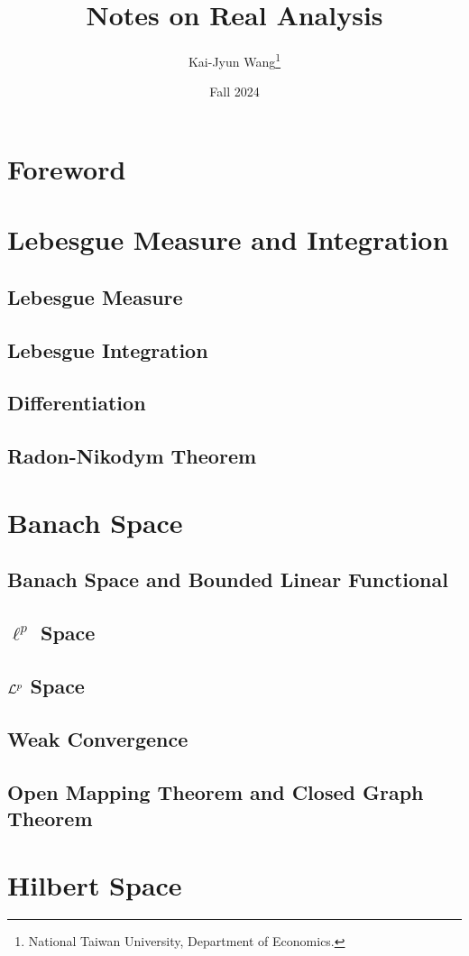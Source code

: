 \documentclass[a4paper, 12pt]{article}
\title{Notes on Real Analysis}
\author{Kai-Jyun Wang\thanks{National Taiwan University, Department of Economics.}}
\date{Fall 2024}
\begin{document}
 
\maketitle

\section*{Foreword}


\newpage
\tableofcontents
\newpage

\section{Lebesgue Measure and Integration}

\subsection{Lebesgue Measure}


\subsection{Lebesgue Integration}


\subsection{Differentiation}


\subsection{Radon-Nikodym Theorem}


\section{Banach Space}

\subsection{Banach Space and Bounded Linear Functional}


\subsection{$\ell^p$ Space}


\subsection{$\mathcal{L}^p$ Space}


\subsection{Weak Convergence}


\subsection{Open Mapping Theorem and Closed Graph Theorem}


\section{Hilbert Space}
\end{document}
